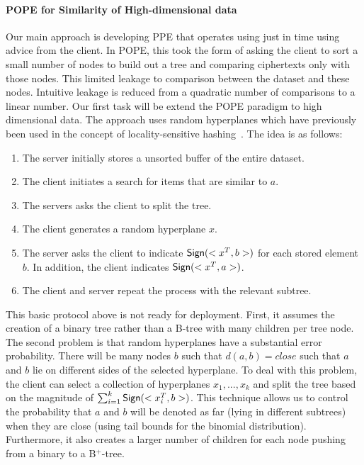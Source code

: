\paragraph{POPE for Similarity of High-dimensional data}
Our main approach is developing PPE that operates using just in time using advice from the client.  In POPE, this took the form of asking the client to sort a small number of nodes to build out a tree and comparing ciphertexts only with those nodes.  This limited leakage to comparison between the dataset and these nodes.  Intuitive leakage is reduced from a quadratic number of comparisons to a linear number.  Our first task will be extend the POPE paradigm to high dimensional data.  The approach uses random hyperplanes which have previously been used in the concept of locality-sensitive hashing~\cite{charikar2002similarity}.  The idea is as follows:

\begin{enumerate}\setlength\itemsep{0em}
\item The server initially stores a unsorted buffer of the entire dataset.
\item The client initiates a search for items that are similar to $a$.
\item The servers asks the client to split the tree.
\item The client generates a random hyperplane $x$.  
\item The server asks the client to indicate $\mathsf{Sign}(<x^T,b>)$ for each stored element $b$. In addition, the client indicates $\mathsf{Sign}(<x^T,a>)$.
\item The client and server repeat the process with the relevant subtree.
\end{enumerate} 

\noindent This basic protocol above is not ready for deployment.  First, it assumes the creation of a binary tree rather than a B-tree with many children per tree node. The second problem is that random hyperplanes have a substantial error probability.  There will be many nodes $b$ such that $d(a, b)=close$ such that $a$ and $b$ lie on different sides of the selected hyperplane.  To deal with this problem, the client can select a collection of hyperplanes $x_1,..., x_k$ and split the tree based on the magnitude of $\sum_{i=1}^k \mathsf{Sign}(<x_i^T, b>)$.  This technique allows us to control the probability that $a$ and $b$ will be denoted as far (lying in different subtrees) when they are close (using tail bounds for the binomial distribution).  Furthermore, it also creates a larger number of children for each node pushing from a binary to a B$^+$-tree.

